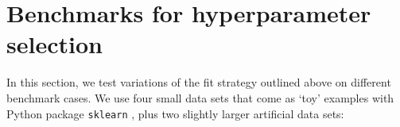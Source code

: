 \section{Benchmarks for hyperparameter selection}
\label{sec_classifier_benchmarks}
%
\begin{center}\end{center}
%
In this section, we test variations of the fit strategy outlined above on different benchmark cases.
We use four small data sets that come as `toy' examples with Python package \texttt{sklearn} \cite{Pedregosa_11}, plus two slightly larger artificial data sets:
%
